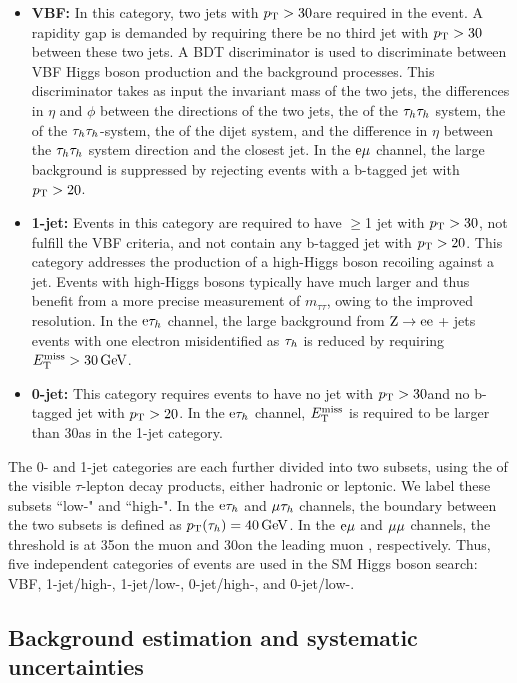 \documentclass[12pt,twoside,a4paper,cmspaper,final,collab]{cms-tdr}
\begin{document}
\begin{itemize}
\item \textbf{VBF:}
In this category, two jets with $p_{\mathrm{T}}>30$\GeV are required in the event.
A rapidity gap is demanded by requiring there be no third jet with $p_{\mathrm{T}}>30$\GeV between these two jets.
A BDT discriminator is used to discriminate between VBF Higgs boson production and the background processes.
This discriminator takes as input the invariant mass of the two jets,
the differences in $\eta$ and $\phi$ between the directions of the two jets,
the \pt of the $\tau_h\tau_h$ system, the \pt of the $\tau_h\tau_h$-\MET system, the \pt of the dijet system,
and the difference in $\eta$ between the $\tau_h\tau_h$ system direction and the closest jet.
In the $\mathrm{e}{\mu}$ channel, the large \ttbar background is suppressed by rejecting events with a b-tagged jet with $p_{\mathrm{T}}>20$\GeV.
\item \textbf{1-jet:} Events in this category are required to have $\ge$1 jet with $p_{\mathrm{T}}>30$\GeV,
not fulfill the VBF criteria,
and not contain any b-tagged jet with $p_{\mathrm{T}}>20$\GeV.
This category addresses the production of a high-\pt Higgs boson recoiling against a jet.
Events with high-\pt Higgs bosons typically have much larger \MET and thus benefit from a more precise measurement of $m_{\tau\tau}$,
owing to the improved \MET resolution.
In the $\mathrm{e}\tau_h$ channel, the large background from  $\mathrm{Z} \to \mathrm{e}\mathrm{e}$ + jets events with one electron misidentified as $\tau_h$ is reduced by requiring $E_{\mathrm{T}}^{\text{miss}}>30\,\text{Ge\hspace{-.08em}V}$.
\item \textbf{0-jet:} This category requires events to have no jet with $p_{\mathrm{T}}>30$\GeV and no b-tagged jet with $p_{\mathrm{T}}>20$\GeV.
In the $\mathrm{e}\tau_h$ channel, $E_{\mathrm{T}}^{\text{miss}}$ is required to be larger than 30\GeV as in the 1-jet category.
\end{itemize}


The 0- and 1-jet categories are each further divided into two subsets, using the \PT of the visible $\tau$-lepton decay products, either hadronic or leptonic. We label these subsets ``low-\pt" and ``high-\pt".
In the $\mathrm{e}\tau_h$ and ${\mu}\tau_h$ channels, the boundary between the two subsets is defined as $p_{\mathrm{T}}(\tau_h)=40\,\text{Ge\hspace{-.08em}V}$.
In the $\mathrm{e}{\mu}$ and ${\mu}{\mu}$ channels, the threshold is at 35\GeV on the muon \PT and 30\GeV on the leading muon \PT, respectively.
Thus, five independent categories of events are used in the SM Higgs boson search: VBF, 1-jet/high-\PT, 1-jet/low-\PT, 0-jet/high-\PT, and 0-jet/low-\PT.


\subsection{Background estimation and systematic uncertainties}
\end{document}
